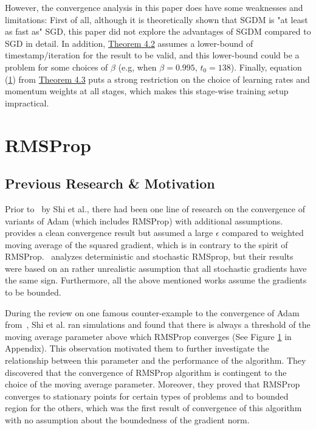 \documentclass{article}
\begin{document}
However, the convergence analysis in this paper does have some weaknesses and limitations: First of all, although it is theoretically shown that SGDM is "at least as fast as" SGD, this paper did not explore the advantages of SGDM compared to SGD in detail. In addition, \hyperref[theom42]{Theorem 4.2} assumes a lower-bound of timestamp/iteration for the result to be valid, and this lower-bound could be a problem for some choices of $\beta$ (e.g, when $\beta = 0.995$, $t_0 = 138$). Finally, equation (\hyperref[eq41]{1}) from \hyperref[theom43]{Theorem 4.3} puts a strong restriction on the choice of learning rates and momentum weights at all stages, which makes this stage-wise training setup impractical.
\section{RMSProp}
\label{section6}
\setcounter{equation}{0}
\subsection{Previous Research \& Motivation}
Prior to~\cite{shi2021rmsprop} by Shi et al., there had been one line of research on the convergence of variants of Adam (which includes RMSProp) with additional assumptions.~\cite{https://doi.org/10.48550/arxiv.2003.02395} provides a clean convergence result but assumed a large $\epsilon$ compared to  weighted moving average of the squared gradient, which is in contrary to the spirit of RMSProp.~\cite{https://doi.org/10.48550/arxiv.1807.06766} analyzes deterministic and stochastic RMSprop, but their results were based on an rather unrealistic assumption that all stochastic gradients have the same sign. Furthermore, all the above mentioned works assume the gradients to be bounded.

During the review on one famous counter-example to the convergence of Adam from~\cite{https://doi.org/10.48550/arxiv.1904.09237}, Shi et al. ran simulations and found that there is always a threshold of the moving average parameter above which
RMSProp converges (See Figure \hyperref[fig1]{1} in Appendix). This observation motivated them to further investigate the relationship between this parameter and the performance of the algorithm. They discovered that the convergence of RMSProp algorithm is
contingent to the choice of the moving average parameter. Moreover, they proved that RMSProp converges to stationary points for certain types of problems and to bounded region for the others, which was the first result of convergence
of this algorithm with no assumption about the boundedness of the gradient norm.
\end{document}
